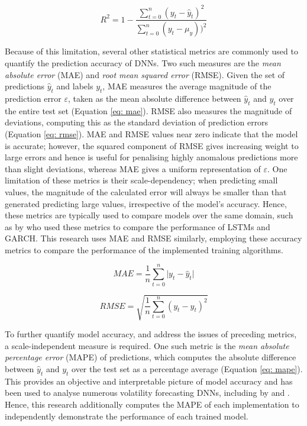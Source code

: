 \documentclass[a4paper, 11pt]{report}
\begin{document}
    \begin{equation}
        \label{eq: r-squared}
        R^2 = 1 - \frac{\sum_{t=0}^n (y_t - \hat{y}_t)^2}{\sum_{t=0}^n (y_t - \mu_{y}))^2}
    \end{equation}


    Because of this limitation, several other statistical metrics are commonly used to quantify the prediction accuracy of DNNs. Two such measures are the \emph{mean absolute error} (MAE) and \emph{root mean squared error} (RMSE). Given the set of predictions $\hat{y}_t$ and labels $y_t$, MAE measures the average magnitude of the prediction error $\varepsilon$, taken as the mean absolute difference between $\hat{y}_t$ and $y_t$ over the entire test set (Equation \ref{eq: mae}). RMSE also measures the magnitude of deviations, computing this as the standard deviation of prediction errors (Equation \ref{eq: rmse}). MAE and RMSE values near zero indicate that the model is accurate; however, the squared component of RMSE gives increasing weight to large errors and hence is useful for penalising highly anomalous predictions more than slight deviations, whereas MAE gives a uniform representation of $\varepsilon$. One limitation of these metrics is their scale-dependency; when predicting small values, the magnitude of the calculated error will always be smaller than that generated predicting large values, irrespective of the model's accuracy. Hence, these metrics are typically used to compare models over the same domain, such as by \citet{rodikov-2022} who used these metrics to compare the performance of LSTMs and GARCH. This research uses MAE and RMSE similarly, employing these accuracy metrics to compare the performance of the implemented training algorithms. 


    \begin{equation}
        \label{eq: mae}
        MAE = \frac{1}{n} \sum_{t=0}^n \lvert y_t - \hat{y}_t \lvert
    \end{equation}
    
    \begin{equation}
        \label{eq: rmse}
        RMSE = \sqrt{\frac{1}{n} \sum_{t=0}^n (y_t - \hat{y}_t)^2}
    \end{equation}


    To further quantify model accuracy, and address the issues of preceding metrics, a scale-independent measure is required. One such metric is the \emph{mean absolute percentage error }(MAPE) of predictions, which computes the absolute difference between $\hat{y}_t$ and $y_t$ over the test set as a percentage average (Equation \ref{eq: mape}). This provides an objective and interpretable picture of model accuracy and has been used to analyse numerous volatility forecasting DNNs, including by \citet{xiong-2016} and \citet{zhang-2022}. Hence, this research additionally computes the MAPE of each implementation to independently demonstrate the performance of each trained model.
\end{document}
